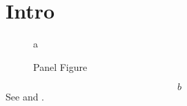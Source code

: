 \section{Intro}
\begin{figure}\caption{Panel Figure}\label{fig:panel}a\end{figure}
\begin{equation}\label{eq:panel}b\end{equation}
See  and .
